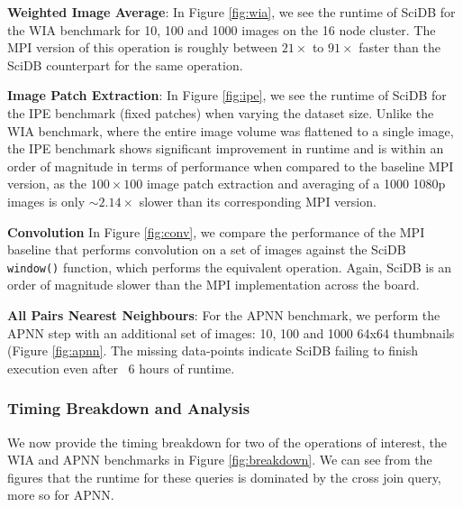 \documentclass[tog]{acmsiggraph}
\begin{document}
\textbf{Weighted Image Average}: In Figure \ref{fig:wia}, we see the runtime of
SciDB for the WIA benchmark for 10, 100 and 1000 images on the 16 node
cluster. The MPI version of this operation is roughly between $21\times$ to
$91\times$ faster than the SciDB counterpart for the same operation.

\textbf{Image Patch Extraction}: In Figure \ref{fig:ipe}, we see the runtime of
SciDB for the IPE benchmark (fixed patches) when varying the dataset
size. Unlike the WIA benchmark, where the entire image volume was flattened to
a single image, the IPE benchmark shows significant improvement in runtime and
is within an order of magnitude in terms of performance when compared to the
baseline MPI version, as the $100\times100$ image patch extraction and
averaging of a 1000 1080p images is only $\sim 2.14\times$ slower than its
corresponding MPI version.

\textbf{Convolution} In Figure \ref{fig:conv}, we compare the performance of
the MPI baseline that performs convolution on a set of images against the SciDB
\texttt{window()} function, which performs the equivalent operation. Again,
SciDB is an order of magnitude slower than the MPI implementation across the
board.

\textbf{All Pairs Nearest Neighbours}: For the APNN benchmark, we perform the
APNN step with an additional set of images: 10, 100 and 1000 64x64 thumbnails
(Figure \ref{fig:apnn}. The missing data-points indicate SciDB failing to
finish execution even after ~6 hours of runtime.


\subsubsection{Timing Breakdown and Analysis}\label{sec:breakdown} We now
provide the timing breakdown for two of the operations of interest, the WIA and
APNN benchmarks in Figure \ref{fig:breakdown}. We can see from the figures that
the runtime for these queries is dominated by the cross join query, more so for
APNN.
\end{document}

